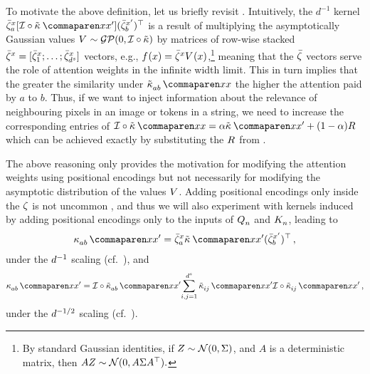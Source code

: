 \documentclass{article}
\begin{document}
To motivate the above definition, let us briefly revisit .
Intuitively, the $d^{-1}$ kernel
$
\softmaxMean_{a}^{\inputSymbol}
[
    \interpKern \circ
    \kerntildef{}{}{\inputSymbol}{\inputSymbol'}
]
(\softmaxMean_{b}^{\inputSymbol'})^\top
$
is a result of multiplying the asymptotically Gaussian values $V_{}^{} \sim \mathcal{GP} (0, \mathcal{I} \circ \tilde{\kappa})$ by matrices of row-wise stacked $\bar{\zeta}^x = [ \bar{\zeta}_1^x ; \ldots ; \bar{\zeta}_{d^s}^x]$ vectors, e.g.,
$
{f}^{}_{}{(x)} =   
\bar{\zeta}^x
V_{}^{}(x)
$,\footnote{By standard Gaussian identities, if $Z \sim \mathcal{N} (0, \Sigma)$, and $A$ is a deterministic matrix, then $A Z \sim \mathcal{N} (0, A \Sigma A^\top).$}
meaning that the $\bar{\zeta}$
vectors serve the role of attention weights in the infinite width limit.
This in turn implies that the greater the similarity under $\kerntildef{a b}{}{\inputSymbol}{\inputSymbol}$ the higher the attention paid by $a$ to $b$.
Thus, if we want to inject information about the relevance of neighbouring pixels in an image or tokens in a string, we need to increase the corresponding entries of
$
    \interpKern \circ
    \kerntildef{}{}{\inputSymbol}{\inputSymbol}
    =
    \interpKernCoeff \kerntildef{}{}{\inputSymbol}{\inputSymbol'}
    +
    (1 - \interpKernCoeff)
    \covPosEmb{}{}
$
which can be achieved exactly by substituting the $R_{}^{}$ from .

The above reasoning only provides the motivation for modifying the attention weights using positional encodings but not necessarily for modifying the asymptotic distribution of the values $V_{}^{}$.
Adding positional encodings only inside the $\zeta$ is not uncommon \citep[e.g.,][]{shaw2018self}, and thus we will also experiment with kernels induced by adding positional encodings
only to the inputs of $Q_{n}^{}$ and $K_{n}^{}$, leading to
\begin{align}\label{eq:decay_lin_scale_kernel}
    \kernelf{a b }{}{\inputSymbol}{\inputSymbol'}
    =
    \softmaxMean_{a}^{\inputSymbol}
        \kerntildef{}{}{\inputSymbol}{\inputSymbol'}
    (\softmaxMean_{b}^{\inputSymbol'})^\top
    \, ,
\end{align}
under the $d^{-1}$ scaling (cf.\ ), and
\begin{align*} %
    \kernelf{a b}{}{\inputSymbol}{\inputSymbol'}
    =
    \interpKern \circ
    \kerntildef{a b}{}{\inputSymbol}{\inputSymbol'}
    \!
    \sum_{i, j=1}^{\spatialDimension}
        \kerntildef{i j}{}{\inputSymbol}{\inputSymbol'}
            \interpKern \circ
            \kerntildef{i j}{}{\inputSymbol}{\inputSymbol'}
    \, ,
\end{align*}
under the $d^{-1/2}$ scaling (cf.\ ).
\end{document}
